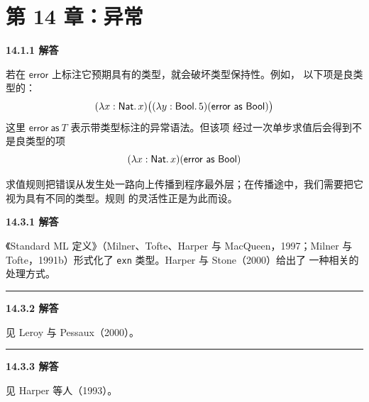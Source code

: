 \newpage
\section{第 14 章：异常}

\begin{taplauthorsolutionentrybox}
\label{sol:author:14.1.1}
\textbf{14.1.1 解答}

若在 \(\mathsf{error}\) 上标注它预期具有的类型，就会破坏类型保持性。例如，
以下项是良类型的：
\[
  (\lambda x:\mathsf{Nat}.\,x)
  \bigl((\lambda y:\mathsf{Bool}.\,5)
        (\mathsf{error}\ \mathsf{as}\ \mathsf{Bool})\bigr)
\]
这里 \(\mathsf{error}\ \mathsf{as}\ T\) 表示带类型标注的异常语法。但该项
经过一次单步求值后会得到不是良类型的项
\[
  (\lambda x:\mathsf{Nat}.\,x)
  (\mathsf{error}\ \mathsf{as}\ \mathsf{Bool})
\]

求值规则把错误从发生处一路向上传播到程序最外层；在传播途中，我们需要把它
视为具有不同的类型。规则  的灵活性正是为此而设。

\end{taplauthorsolutionentrybox}

\begin{taplauthorsolutionentrybox}
\label{sol:author:14.3.1}
\textbf{14.3.1 解答}

《Standard ML 定义》（Milner、Tofte、Harper 与 MacQueen，1997；Milner 与
Tofte，1991b）形式化了 \texttt{exn} 类型。Harper 与 Stone（2000）给出了
一种相关的处理方式。

\medskip
\hrule
\medskip
{}
\label{sol:author:14.3.2}
\textbf{14.3.2 解答}

见 Leroy 与 Pessaux（2000）。

\medskip
\hrule
\medskip
{}
\label{sol:author:14.3.3}
\textbf{14.3.3 解答}

见 Harper 等人（1993）。

\end{taplauthorsolutionentrybox}
